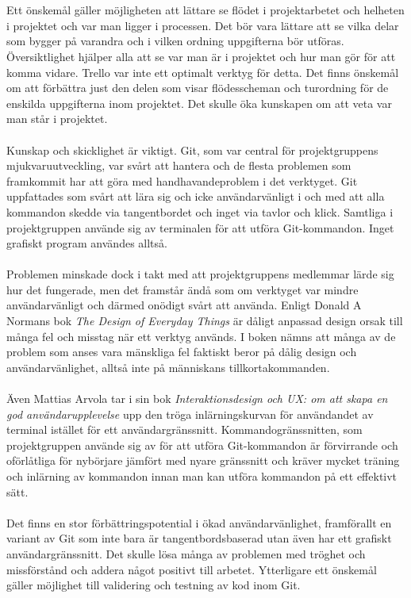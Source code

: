 \\\\
Ett önskemål gäller möjligheten att lättare se flödet i projektarbetet och helheten i projektet och var man ligger i processen. Det bör vara lättare att se vilka delar som bygger på varandra och i vilken ordning uppgifterna bör utföras. Översiktlighet hjälper alla att se var man är i projektet och hur man gör för att komma vidare. Trello var inte ett optimalt verktyg för detta. Det finns önskemål om att förbättra just den delen som visar flödesscheman och turordning för de enskilda uppgifterna inom projektet. Det skulle öka kunskapen om att veta var man står i projektet.
\\\\
Kunskap och skicklighet är viktigt. Git, som var central för projektgruppens mjukvaruutveckling, var svårt att hantera och de flesta problemen som framkommit har att göra med handhavandeproblem i det verktyget. Git uppfattades som svårt att lära sig och icke användarvänligt i och med att alla kommandon skedde via tangentbordet och inget via tavlor och klick. Samtliga i projektgruppen använde sig av terminalen för att utföra Git-kommandon. Inget grafiskt program användes alltså.
\\\\
Problemen minskade dock i takt med att projektgruppens medlemmar lärde sig hur det fungerade, men det framstår ändå som om verktyget var mindre användarvänligt och därmed onödigt svårt att använda. Enligt Donald A Normans bok \textit{The Design of Everyday Things} \cite{book:the-design-of-everyday-things} är dåligt anpassad design orsak till många fel och misstag när ett verktyg används. I boken nämns att många av de problem som anses vara mänskliga fel faktiskt beror på dålig design och användarvänlighet, alltså inte på människans tillkortakommanden. 
\\\\
Även Mattias Arvola tar i sin bok \textit{Interaktionsdesign och UX: om att skapa en god användarupplevelse} \cite{arvolaboken} upp den tröga inlärningskurvan för användandet av terminal istället för ett användargränssnitt. Kommandogränssnitten, som projektgruppen använde sig av för att utföra Git-kommandon är förvirrande och oförlåtliga för nybörjare jämfört med nyare gränssnitt och kräver mycket träning och inlärning av kommandon innan man kan utföra kommandon på ett effektivt sätt. 
\\\\
Det finns en stor förbättringspotential i ökad användarvänlighet, framförallt en variant av Git som inte bara är tangentbordsbaserad utan även har ett grafiskt användargränssnitt. Det skulle lösa många av problemen med tröghet och missförstånd och addera något positivt till arbetet. Ytterligare ett önskemål gäller möjlighet till validering och testning av kod inom Git.
